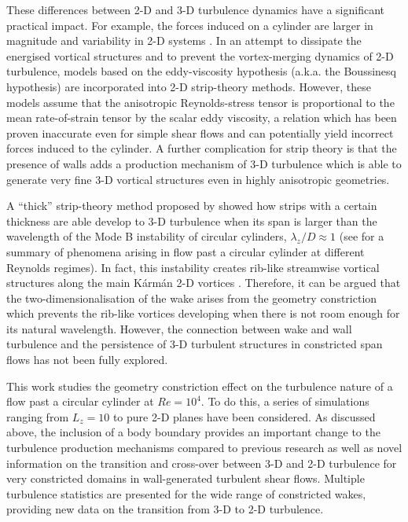 \documentclass[../main.tex]{subfiles}
\begin{document}
These differences between 2-D and 3-D turbulence dynamics have a significant practical impact.
For example, the forces induced on a cylinder are larger in magnitude and variability in 2-D systems \citep{Mittal1995, Norberg2003}.
In an attempt to dissipate the energised vortical structures and to prevent the vortex-merging dynamics of 2-D turbulence, models based on the eddy-viscosity hypothesis (a.k.a. the Boussinesq hypothesis) are incorporated into 2-D strip-theory methods.
However, these models assume that the anisotropic Reynolds-stress tensor is proportional to the mean rate-of-strain tensor by the scalar eddy viscosity, a relation which has been proven inaccurate even for simple shear flows \citep[p. 94]{Pope2000} and can potentially yield incorrect forces induced to the cylinder.
A further complication for strip theory is that the presence of walls adds a production mechanism of 3-D turbulence which is able to generate very fine 3-D vortical structures even in highly anisotropic geometries.

A ``thick'' strip-theory method proposed by \cite{Bao2016} showed how strips with a certain thickness are able develop to 3-D turbulence when its span is larger than the wavelength of the Mode B instability of circular cylinders, $\lambda_z/D\approx1$ (see  for a summary of phenomena arising in flow past a circular cylinder at different Reynolds regimes).
In fact, this instability creates rib-like streamwise vortical structures along the main K\'{a}rm\'{a}n 2-D vortices \citep{Noack1999}.
Therefore, it can be argued that the two-dimensionalisation of the wake arises from the geometry constriction which prevents the rib-like vortices developing when there is not room enough for its natural wavelength.
However, the connection between wake and wall turbulence and the persistence of 3-D turbulent structures in constricted span flows has not been fully explored.

This work studies the geometry constriction effect on the turbulence nature of a flow past a circular cylinder at $Re=10^4$.
To do this, a series of simulations ranging from $L_z=10$ to pure 2-D planes have been considered.
As discussed above, the inclusion of a body boundary provides an important change to the turbulence production mechanisms compared to previous research as well as novel information on the transition and cross-over between 3-D and 2-D turbulence for very constricted domains in wall-generated turbulent shear flows.
Multiple turbulence statistics are presented for the wide range of constricted wakes, providing new data on the transition from 3-D to 2-D turbulence.
\end{document}
